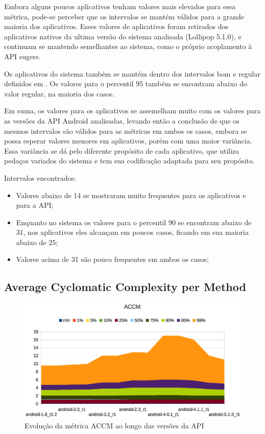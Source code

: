 Embora alguns poucos aplicativos tenham valores mais elevados para essa métrica, pode-se perceber que os intervalos se mantém válidos para a grande maioria dos aplicativos. Esses valores de aplicativos foram retirados dos aplicativos nativos da ultima versão do sistema analisada (Lollipop 5.1.0), e continuam se mantendo semelhantes ao sistema, como o próprio acoplamento à API sugere. 

Os aplicativos do sistema também se mantém dentro dos intervalos bom e regular definidos em . Os valores para o percentil 95 também se encontram abaixo do valor regular, na maioria dos casos.

Em suma, os valores para os aplicativos se assemelham muito com os valores para as versões da API Android analisadas, levando então a conclusão de que os mesmos intervalos são válidos para as métricas em ambos os casos, embora se possa esperar valores menores em aplicativos, porém com uma maior variância. Essa variância se dá pelo diferente propósito de cada aplicativo, que utiliza pedaços variados do sistema e tem sua codificação adaptada para seu propósito.

Intervalos encontrados:

\begin{itemize}
\item Valores abaixo de 14 se mostraram muito frequentes para os aplicativos e para a API;
\item Enquanto no sistema os valores para o percentil 90 se encontram abaixo de 31, nos aplicativos eles alcançam em poucos casos, ficando em sua maioria abaixo de 25;
\item Valores acima de 31 são pouco frequentes em ambos os casos;
\end{itemize}

\subsection{Average Cyclomatic Complexity per Method}

\begin{figure}[!htb]
\centering
\includegraphics [keepaspectratio=true,scale=0.85]{figuras/graphs/accm_android.eps}
\caption{Evolução da métrica ACCM ao longo das versões da API}
\label{fig:accm_android}
\end{figure}

